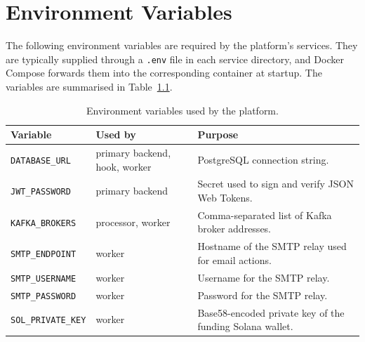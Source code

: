 \chapter{Environment Variables}

The following environment variables are required by the platform's services. They are typically supplied through a \texttt{.env} file in each service directory, and Docker Compose forwards them into the corresponding container at startup. The variables are summarised in Table~\ref{tab:env}.

\begin{table}[h]
\centering
\caption{Environment variables used by the platform.}
\label{tab:env}
\renewcommand{\arraystretch}{1.3}
\begin{tabular}{|p{3.8cm}|p{4.5cm}|p{5cm}|}
\hline
\textbf{Variable} & \textbf{Used by} & \textbf{Purpose} \\ \hline
\texttt{DATABASE\_URL} & primary backend, hook, worker & PostgreSQL connection string. \\ \hline
\texttt{JWT\_PASSWORD} & primary backend & Secret used to sign and verify JSON Web Tokens. \\ \hline
\texttt{KAFKA\_BROKERS} & processor, worker & Comma-separated list of Kafka broker addresses. \\ \hline
\texttt{SMTP\_ENDPOINT} & worker & Hostname of the SMTP relay used for email actions. \\ \hline
\texttt{SMTP\_USERNAME} & worker & Username for the SMTP relay. \\ \hline
\texttt{SMTP\_PASSWORD} & worker & Password for the SMTP relay. \\ \hline
\texttt{SOL\_PRIVATE\_KEY} & worker & Base58-encoded private key of the funding Solana wallet. \\ \hline
\end{tabular}
\end{table}

